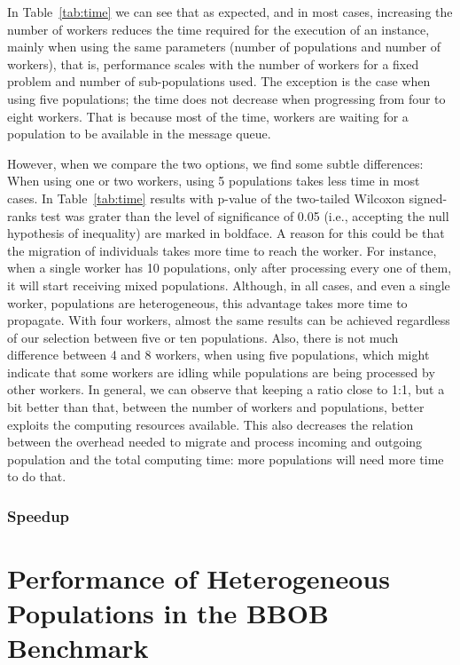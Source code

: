 \documentclass[review]{elsarticle}
\begin{document}
In Table~\ref{tab:time} we can see that as expected, and in most cases, 
increasing the number of workers reduces the time
required for the execution of an instance, 
mainly when using the same parameters
(number of populations and number of workers), that is, performance
scales with the number of workers for a fixed problem and number of
sub-populations used. The exception is the case when using five populations;
the time does not decrease when progressing from four to eight workers.  
That is because most of the time, workers are waiting for a population 
to be available in the message queue.

However, when we compare the two
options, we find some subtle differences: When using one or two
workers, using 5 populations takes less time in most cases. 
In Table~\ref{tab:time} results with p-value of the two-tailed Wilcoxon
signed-ranks test was grater than the level of significance of 0.05 
(i.e., accepting the null hypothesis of inequality) are marked in boldface.
A reason for this could be that the migration of individuals takes more time to
reach the worker. For instance, when a single worker has 10 populations, only
after processing every one of them, it will start receiving mixed populations.  Although, in
all cases, and even a single worker, populations are heterogeneous, this
advantage takes more time to propagate. With four workers, almost the same
results can be achieved regardless of our selection between five or ten
populations. Also, there is not much difference between 4 and 8 workers, when
using five populations, which might indicate that some workers are
idling while populations are being processed by other workers. In
general, we can observe that keeping a ratio close to 1:1, but a bit
better than that, between the number of workers and populations, better exploits the computing
resources available. This also decreases the relation between the
overhead needed to migrate and process incoming and outgoing
population and the total computing time: more populations will need
more time to do that.


\subsubsection{Speedup}
\label{sec:speedup}


\section{Performance of Heterogeneous Populations in the BBOB Benchmark}
\label{sec:exp2}
\end{document}
